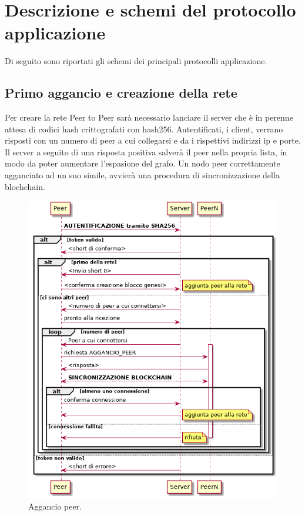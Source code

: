 \documentclass[a4paper,10pt]{report}
\begin{document}
 
  \chapter{Descrizione e schemi del protocollo applicazione}
  Di seguito sono riportati gli schemi dei principali protocolli applicazione.
  \section{Primo aggancio e creazione della rete}
  Per creare la rete Peer to Peer sarà necessario lanciare il server che è in perenne attesa di codici hash crittografati con hash256. Autentificati, i client, verrano risposti con un numero di peer a cui collegarsi e da i rispettivi indirizzi ip e porte. Il server a seguito di una risposta positiva salverà il peer nella propria lista, in modo da poter aumentare l'espasione del grafo.
 Un nodo peer correttamente agganciato ad un suo simile, avvierà una procedura di sincronizzazione della blochchain.
  \begin{figure}[H]
  \center\includegraphics[scale=0.40]{hookpeer.png}
  \caption{Aggancio peer.}
  \end{figure}
  
\end{document}
